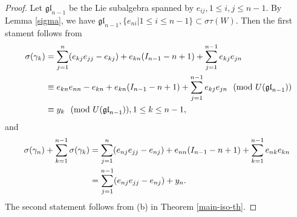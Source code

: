 \documentclass[12pt,a4paper]{amsart}
\newtheorem{lemma}[theorem]{Lemma}%
\numberwithin{equation}{section}
\def\gl{\mathfrak{gl}}
\begin{document}
\begin{proof}

Let $\gl_{n-1}$ be the Lie subalgebra spanned by $e_{ij},  1 \leq i,j \leq n-1$. By Lemma \ref{sigma}, we have $\gl_{n-1}, \{e_{ni}| 1 \leq i\leq n-1\}\subset \sigma\tau(W)$.
Then the first stament follows from
$$\aligned\  \sigma( \gamma_k)
& = \sum_{j=1}^n (e_{kj}e_{jj}-e_{kj})
 +e_{kn}(I_{n-1}-n+1)
+\sum_{j=1}^{n-1} e_{kj}e_{jn}\\
  & \equiv   e_{kn}e_{nn}-e_{kn}
 +e_{kn}(I_{n-1}-n+1)
+\sum_{j=1}^{n-1} e_{kj}e_{jn} \ \   (\text{mod}\ U(\gl_{n-1}) )\\
  & \equiv
 y_k
\ \   (\text{mod}\ U(\gl_{n-1}) ),   1 \leq k \leq n-1,
\endaligned $$
and
$$\aligned \sigma(\gamma_n)+\sum_{k=1}^{n-1}\sigma(\gamma_k)
& = \sum_{j=1}^n (e_{nj}e_{jj}-e_{nj})+e_{nn}(I_{n-1}-n+1)+ \sum_{k=1}^{n-1} e_{nk}e_{kn}\\
& =  \sum_{j=1}^{n-1} (e_{nj}e_{jj}-e_{nj})+ y_n.
\endaligned $$
The second statement  follows from (b) in Theorem \ref{main-iso-th}.
\end{proof}
%
\end{document}
